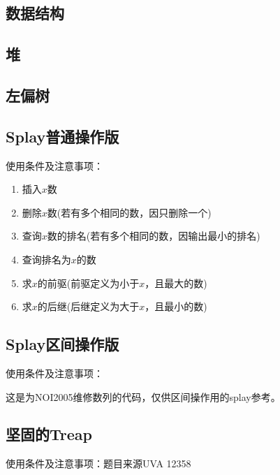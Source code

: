 \documentclass[landscape, oneside, a4paper, cs4size]{book}
\begin{document}
\begin{multicols}{2}
		\chapter{数据结构}
			\section{堆}
			\begin{spacing}{0.8}
				
			\end{spacing}
			\section{左偏树}
			\begin{spacing}{0.8}
				
			\end{spacing}
			\section{Splay普通操作版}
			\begin{spacing}{0.8}
				使用条件及注意事项：\par
				\begin{enumerate}\setlength{\itemsep}{-\itemsep}
					\item 插入$x$数
					\item 删除$x$数(若有多个相同的数，因只删除一个)
					\item 查询$x$数的排名(若有多个相同的数，因输出最小的排名)
					\item 查询排名为$x$的数
					\item 求$x$的前驱(前驱定义为小于$x$，且最大的数)
					\item 求$x$的后继(后继定义为大于$x$，且最小的数)
				\end{enumerate}
				
			\end{spacing}
			\section{Splay区间操作版}
			\begin{spacing}{0.8}
				使用条件及注意事项：\par
				这是为NOI2005维修数列的代码，仅供区间操作用的splay参考。
				
			\end{spacing}
			\section{坚固的Treap}
			\begin{spacing}{0.8}
				使用条件及注意事项：题目来源UVA 12358
				
			\end{spacing}

\end{multicols}
\end{document}
